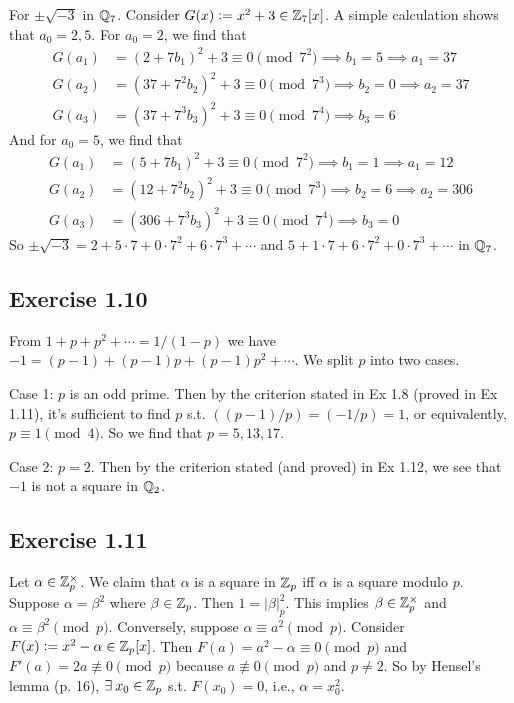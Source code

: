 \documentclass[../Koblitz.tex]{subfiles}
\begin{document}
For $\pm\sqrt{-3}$ in $\mathbb{Q}_7$. Consider $G(x):=x^2+3\in\mathbb{Z}_7[x]$. A simple calculation shows that $a_0=2,5$. For $a_0=2$, we find that
\begin{align*}
G(a_1)&=(2+7b_1)^2+3\equiv 0\pmod{7^2} \implies b_1=5 \implies a_1=37 \\
G(a_2)&=(37+7^2b_2)^2+3\equiv 0\pmod{7^3} \implies b_2=0 \implies a_2=37\\
G(a_3)&=(37+7^3b_3)^2+3\equiv 0\pmod{7^4} \implies b_3=6
\end{align*}
And for $a_0=5$, we find that
\begin{align*}
G(a_1)&=(5+7b_1)^2+3\equiv 0\pmod{7^2} \implies b_1=1 \implies a_1=12 \\
G(a_2)&=(12+7^2b_2)^2+3\equiv 0\pmod{7^3} \implies b_2=6 \implies a_2=306 \\
G(a_3)&=(306+7^3b_3)^2+3\equiv 0\pmod{7^4} \implies b_3=0
\end{align*}
So $\pm\sqrt{-3}=2+5\cdot7+0\cdot7^2+6\cdot7^3+\cdots$ and $5+1\cdot7+6\cdot7^2+0\cdot7^3+\cdots$ in $\mathbb{Q}_7$.

\subsection*{Exercise 1.10}

From $1+p+p^2+\cdots=1/(1-p)$ we have $-1=(p-1)+(p-1)p+(p-1)p^2+\cdots$. We split $p$ into two cases.

Case 1: $p$ is an odd prime. Then by the criterion stated in Ex 1.8 (proved in Ex 1.11), it's sufficient to find $p$ s.t. $((p-1)/p)=(-1/p)=1$, or equivalently, $p\equiv1\pmod{4}$. So we find that $p=5,13,17$.

Case 2: $p=2$. Then by the criterion stated (and proved) in Ex 1.12, we see that $-1$ is not a square in $\mathbb{Q}_2$.

\subsection*{Exercise 1.11}

Let $\alpha\in\mathbb{Z}_p^\times$. We claim that $\alpha$ is a square in $\mathbb{Z}_p$ iff $\alpha$ is a square modulo $p$. Suppose $\alpha=\beta^2$ where $\beta\in\mathbb{Z}_p$. Then $1=|\beta|_p^2$. This implies $\beta\in\mathbb{Z}_p^\times$ and $\alpha\equiv \beta^2 \pmod{p}$. Conversely, suppose $\alpha\equiv a^2 \pmod{p}$. Consider $F(x):=x^2-\alpha\in\mathbb{Z}_p[x]$. Then $F(a)=a^2-\alpha\equiv0\pmod{p}$ and $F'(a)=2a\not\equiv0 \pmod{p}$ because $a\not\equiv0\pmod{p}$ and $p\neq2$. So by Hensel's lemma (p. 16), $\exists x_0\in\ZZ_p$ s.t. $F(x_0)=0$, i.e., $\alpha=x_0^2$.
\end{document}
